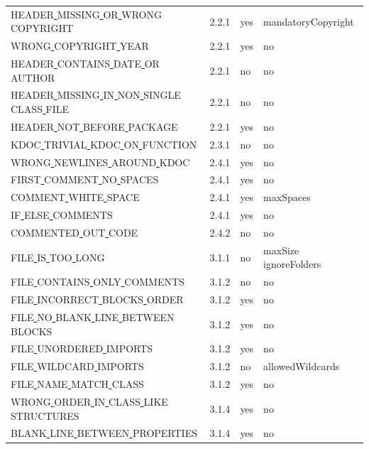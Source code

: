 \begin{longtable}{ |l|p{0.8cm}|p{0.8cm}| p{3cm} | }
HEADER\underline{ }MISSING\underline{ }OR\underline{ }WRONG\underline{ }COPYRIGHT & 2.2.1 &  yes  &  mandatoryCopyright \\
WRONG\underline{ }COPYRIGHT\underline{ }YEAR & 2.2.1 &  yes  &   no  \\
HEADER\underline{ }CONTAINS\underline{ }DATE\underline{ }OR\underline{ }AUTHOR & 2.2.1 &  no  &   no  \\
HEADER\underline{ }MISSING\underline{ }IN\underline{ }NON\underline{ }SINGLE\underline{ }CLASS\underline{ }FILE & 2.2.1 &  no  &   no  \\
HEADER\underline{ }NOT\underline{ }BEFORE\underline{ }PACKAGE & 2.2.1 &  yes  &   no  \\
KDOC\underline{ }TRIVIAL\underline{ }KDOC\underline{ }ON\underline{ }FUNCTION & 2.3.1 &  no  &   no  \\
WRONG\underline{ }NEWLINES\underline{ }AROUND\underline{ }KDOC & 2.4.1 &  yes  &   no  \\
FIRST\underline{ }COMMENT\underline{ }NO\underline{ }SPACES & 2.4.1 &  yes  &   no  \\
COMMENT\underline{ }WHITE\underline{ }SPACE & 2.4.1 &  yes  &   maxSpaces  \\
IF\underline{ }ELSE\underline{ }COMMENTS & 2.4.1 &  yes  &   no  \\
COMMENTED\underline{ }OUT\underline{ }CODE & 2.4.2 &  no  &   no  \\
FILE\underline{ }IS\underline{ }TOO\underline{ }LONG & 3.1.1 &  no  &   maxSize  ignoreFolders  \\
FILE\underline{ }CONTAINS\underline{ }ONLY\underline{ }COMMENTS & 3.1.2 &  no  &   no  \\
FILE\underline{ }INCORRECT\underline{ }BLOCKS\underline{ }ORDER & 3.1.2 &  yes  &   no  \\
FILE\underline{ }NO\underline{ }BLANK\underline{ }LINE\underline{ }BETWEEN\underline{ }BLOCKS & 3.1.2 &  yes  &   no  \\
FILE\underline{ }UNORDERED\underline{ }IMPORTS & 3.1.2 &  yes  &   no  \\
FILE\underline{ }WILDCARD\underline{ }IMPORTS & 3.1.2 &  no  &   allowedWildcards           \\
FILE\underline{ }NAME\underline{ }MATCH\underline{ }CLASS & 3.1.2 &  yes  &   no  \\
WRONG\underline{ }ORDER\underline{ }IN\underline{ }CLASS\underline{ }LIKE\underline{ }STRUCTURES & 3.1.4 &  yes  &   no  \\
BLANK\underline{ }LINE\underline{ }BETWEEN\underline{ }PROPERTIES & 3.1.4 &  yes  &   no  \\

\end{longtable}
